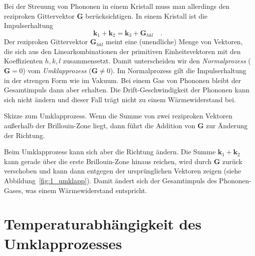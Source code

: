 Bei der Streuung von Phononen in einem Kristall muss man allerdings den reziproken Gittervektor $\mathbf{G}$ berücksichtigen. In einem Kristall ist die Impulserhaltung
\begin{equation}
    \mathbf{k}_1 +  \mathbf{k}_2 =  \mathbf{k}_3 +  \mathbf{G}_{hkl}  \quad .
\end{equation}
Der reziproken Gittervektor $\mathbf{G}_{hkl}$ meint eine (unendliche) Menge von Vektoren, die sich aus den Linearkombinationen der primitiven Einheitsvektoren mit den Koeffizienten $h,k,l$ zusammensetzt. Damit unterscheiden wir den \emph{Normalprozess} ($\mathbf{G} = 0$) vom \emph{Umklapprozess} ($\mathbf{G} \neq 0$). Im Normalprozess gilt die Impulserhaltung in der strengen Form wie im Vakuum. Bei einem Gas von Phononen bleibt der Gesamtimpuls dann aber erhalten. Die Drift-Geschwindigkeit der Phononen kann sich nicht ändern und dieser Fall trägt nicht zu einem Wärmewiderstand bei.

\begin{marginfigure}
   \caption{Skizze zum Umklapprozess. Wenn die Summe von zwei reziproken Vektoren außerhalb der Brillouin-Zone liegt, dann führt die Addition von $\mathbf{G}$ zur Änderung der Richtung. }
   \label{fig:1_umklapp}
\end{marginfigure}

Beim Umklapprozess kann sich aber die Richtung ändern. Die Summe $ \mathbf{k}_1 +  \mathbf{k}_2 $ kann gerade über die erste Brillouin-Zone hinaus reichen, wird durch $\mathbf{G}$ zurück verschoben und kann dann entgegen der ursprünglichen Vektoren zeigen (siehe Abbildung~\ref{fig:1_umklapp}). Damit ändert sich der Gesamtimpuls des Phononen-Gases, was einem Wärmewiderstand entspricht.



\section{Temperaturabhängigkeit des Umklapprozesses}

